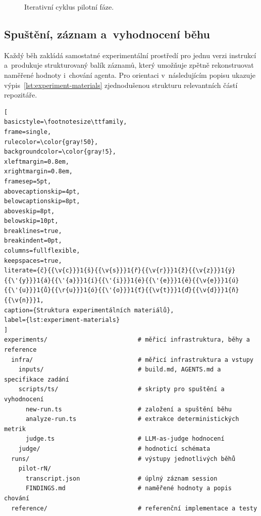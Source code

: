 \begin{figure}[H]
\centering
{}
\caption{Iterativní cyklus pilotní fáze.}
\label{fig:iterativni-cyklus}
\end{figure}
\FloatBarrier

\subsection{Spuštění, záznam a~vyhodnocení běhu}
\label{sec:zaznam-bezhu}

Každý běh zakládá samostatné experimentální prostředí pro jednu
verzi instrukcí a~produkuje strukturovaný balík záznamů, který
umožňuje zpětně rekonstruovat naměřené hodnoty i~chování agenta. Pro
orientaci v~následujícím popisu ukazuje
výpis~\ref{lst:experiment-materials} zjednodušenou strukturu
relevantních částí repozitáře.

\begin{lstlisting}[
basicstyle=\footnotesize\ttfamily,
frame=single,
rulecolor=\color{gray!50},
backgroundcolor=\color{gray!5},
xleftmargin=0.8em,
xrightmargin=0.8em,
framesep=5pt,
abovecaptionskip=4pt,
belowcaptionskip=8pt,
aboveskip=8pt,
belowskip=10pt,
breaklines=true,
breakindent=0pt,
columns=fullflexible,
keepspaces=true,
literate={č}{{\v{c}}}1{š}{{\v{s}}}1{ř}{{\v{r}}}1{ž}{{\v{z}}}1{ý}{{\'{y}}}1{á}{{\'{a}}}1{í}{{\'{i}}}1{é}{{\'{e}}}1{ě}{{\v{e}}}1{ú}{{\'{u}}}1{ů}{{\r{u}}}1{ó}{{\'{o}}}1{ť}{{\v{t}}}1{ď}{{\v{d}}}1{ň}{{\v{n}}}1,
caption={Struktura experimentálních materiálů},
label={lst:experiment-materials}
]
experiments/                         # měřicí infrastruktura, běhy a reference
  infra/                             # měřicí infrastruktura a vstupy
    inputs/                          # build.md, AGENTS.md a specifikace zadání
    scripts/ts/                      # skripty pro spuštění a vyhodnocení
      new-run.ts                     # založení a spuštění běhu
      analyze-run.ts                 # extrakce deterministických metrik
      judge.ts                       # LLM-as-judge hodnocení
    judge/                           # hodnoticí schémata
  runs/                              # výstupy jednotlivých běhů
    pilot-rN/
      transcript.json                # úplný záznam session
      FINDINGS.md                    # naměřené hodnoty a popis chování
  reference/                         # referenční implementace a testy
\end{lstlisting}

